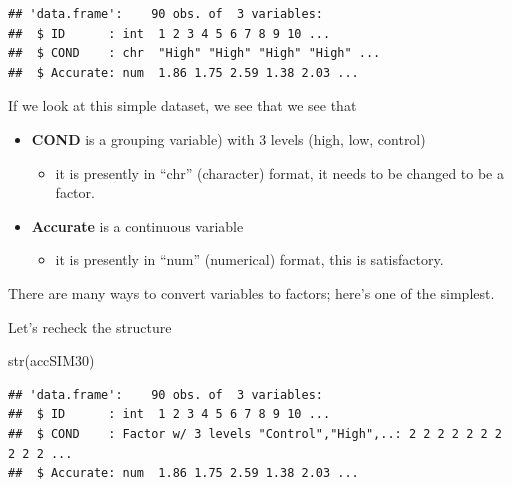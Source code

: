 \documentclass[
  english,
]{book}
\newenvironment{Shaded}{\begin{snugshade}}{\end{snugshade}}
\newcommand{\FunctionTok}[1]{\textcolor[rgb]{0.00,0.00,0.00}{#1}}
\newcommand{\NormalTok}[1]{#1}
\newcommand{\OtherTok}[1]{\textcolor[rgb]{0.56,0.35,0.01}{#1}}
\newcommand{\SpecialCharTok}[1]{\textcolor[rgb]{0.00,0.00,0.00}{#1}}
\providecommand{\tightlist}{%
  \setlength{\itemsep}{0pt}\setlength{\parskip}{0pt}}
\begin{document}
\begin{verbatim}
## 'data.frame':    90 obs. of  3 variables:
##  $ ID      : int  1 2 3 4 5 6 7 8 9 10 ...
##  $ COND    : chr  "High" "High" "High" "High" ...
##  $ Accurate: num  1.86 1.75 2.59 1.38 2.03 ...
\end{verbatim}

If we look at this simple dataset, we see that we see that

\begin{itemize}
\tightlist
\item
  \textbf{COND} is a grouping variable) with 3 levels (high, low, control)

  \begin{itemize}
  \tightlist
  \item
    it is presently in ``chr'' (character) format, it needs to be changed to be a factor.
  \end{itemize}
\item
  \textbf{Accurate} is a continuous variable

  \begin{itemize}
  \tightlist
  \item
    it is presently in ``num'' (numerical) format, this is satisfactory.
  \end{itemize}
\end{itemize}

There are many ways to convert variables to factors; here's one of the simplest.

\begin{Shaded}
\end{Shaded}

Let's recheck the structure

\begin{Shaded}
\begin{Highlighting}[]
\FunctionTok{str}\NormalTok{(accSIM30)}
\end{Highlighting}
\end{Shaded}

\begin{verbatim}
## 'data.frame':    90 obs. of  3 variables:
##  $ ID      : int  1 2 3 4 5 6 7 8 9 10 ...
##  $ COND    : Factor w/ 3 levels "Control","High",..: 2 2 2 2 2 2 2 2 2 2 ...
##  $ Accurate: num  1.86 1.75 2.59 1.38 2.03 ...
\end{verbatim}
\end{document}

